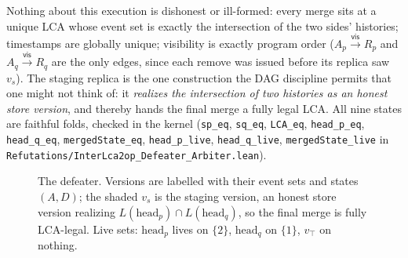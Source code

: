 \documentclass[11pt]{article}
\newcommand{\vis}{\xrightarrow{\mathsf{vis}}}
\newcommand{\lean}[1]{\texttt{#1}}
\newcommand{\Ap}{A_p}
\newcommand{\Aq}{A_q}
\newcommand{\Rp}{R_p}
\newcommand{\Rq}{R_q}
\begin{document}
Nothing about this execution is dishonest or ill-formed: every merge
sits at a unique LCA whose event set is exactly the intersection of the
two sides' histories; timestamps are globally unique; visibility is
exactly program order ($\Ap \vis \Rp$ and $\Aq \vis \Rq$ are the only
edges, since each remove was issued before its replica saw $v_s$). The
staging replica is the one construction the DAG discipline permits that
one might not think of: it \emph{realizes the intersection of two
histories as an honest store version}, and thereby hands the final
merge a fully legal LCA. All nine states are faithful folds, checked in
the kernel (\lean{sp\_eq}, \lean{sq\_eq}, \lean{LCA\_eq},
\lean{head\_p\_eq}, \lean{head\_q\_eq}, \lean{mergedState\_eq},
\lean{head\_p\_live}, \lean{head\_q\_live}, \lean{mergedState\_live} in
\lean{Refutations/InterLca2op\_Defeater\_Arbiter.lean}).

\begin{figure}[t]
\centering
{}
\caption{The defeater. Versions are labelled with their event sets and
states $(A, D)$; the shaded $v_s$ is the staging version, an honest
store version realizing
$L(\mathrm{head}_p) \cap L(\mathrm{head}_q)$, so the final merge is
fully LCA-legal. Live sets: $\mathrm{head}_p$ lives on $\{2\}$,
$\mathrm{head}_q$ on $\{1\}$, $v_\top$ on nothing.}
\label{fig:defeater}
\end{figure}
\end{document}
